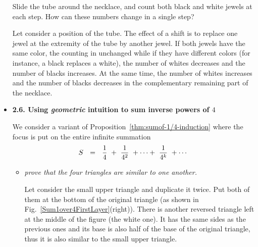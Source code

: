 \begin{itemize}
\smallskip

Slide the tube around the necklace, and count both black and white jewels at each step.  
How can these numbers change in a single step?
\smallskip

Let consider a position of the tube. 
The effect of a shift is to replace one jewel at the extremity of the tube by another jewel. 
If both jewels have the same color, the counting in unchanged while if they have different colors
(for instance, a black replaces a white), the number of whites decreases and the number of blacks increases. 
At the same time, the number of whites increases and the number of blacks decreases in the complementary 
remaining part of the necklace. 

\medskip \item
{\bf 2.6. Using {\em geometric} intuition to sum inverse powers of $4$}
\smallskip

We consider a variant of Proposition~\ref{thm:sumof-1/4-induction} where the focus is put on the entire infinite summation
\[ S \ \ = \ \  {1 \over 4} \ + \  {1 \over 4^2} \ + \cdots + \ {1 \over 4^k} \ + \cdots  \]

\smallskip


\begin{itemize}
\item
{\em prove that the four triangles are similar to one another.}
\smallskip

Let consider the small upper triangle and duplicate it twice.
Put both of them at the bottom of the original triangle
(as shown in Fig.~\ref{Sum1over4FirstLayer}(right)). 
There is another reversed triangle left at the middle of the figure (the white one). 
It has the same sides as the previous ones and its base is also half of the base of the original triangle,
thus it is also similar to the small upper triangle.


\end{itemize}
\end{itemize}
